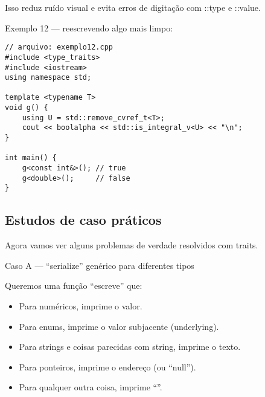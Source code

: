 \documentclass[11pt]{article}
\begin{document}
Isso reduz ruído visual e evita erros de digitação com ::type e ::value.

Exemplo 12 — reescrevendo algo mais limpo:
\begin{verbatim}
// arquivo: exemplo12.cpp
#include <type_traits>
#include <iostream>
using namespace std;

template <typename T>
void g() {
    using U = std::remove_cvref_t<T>;
    cout << boolalpha << std::is_integral_v<U> << "\n";
}

int main() {
    g<const int&>(); // true
    g<double>();     // false
}
\end{verbatim}
\subsection{Estudos de caso práticos}
\label{sec:org2ff2b34}

Agora vamos ver alguns problemas de verdade resolvidos com traits.

Caso A — “serialize” genérico para diferentes tipos

Queremos uma função “escreve” que:

\begin{itemize}
\item Para numéricos, imprime o valor.
\item Para enums, imprime o valor subjacente (underlying).
\item Para strings e coisas parecidas com string, imprime o texto.
\item Para ponteiros, imprime o endereço (ou “null”).
\item Para qualquer outra coisa, imprime “”.
\end{itemize}
\end{document}
